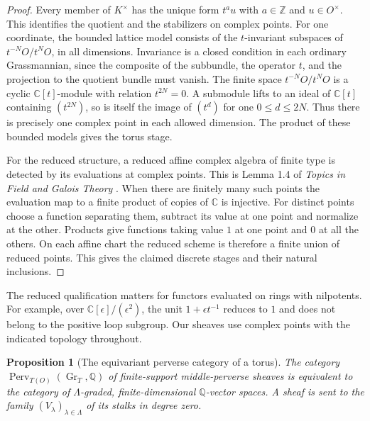\documentclass[11pt,oneside,openany]{book}
\newtheorem{proposition}[theorem]{Proposition}
\theoremstyle{definition}
\theoremstyle{remark}
\begin{document}
\begin{proof}
Every member of \(K^\times\) has the unique form \(t^a u\)
with \(a\in\mathbb Z\) and \(u\in O^\times\).
This identifies the quotient and the stabilizers on complex points.
For one coordinate, the bounded lattice model consists of the
\(t\)-invariant subspaces of \(t^{-N}O/t^NO\), in all dimensions.
Invariance is a closed condition in each ordinary Grassmannian,
since the composite of the subbundle, the operator \(t\), and the
projection to the quotient bundle must vanish.
The finite space \(t^{-N}O/t^NO\) is a cyclic \(\mathbb C[t]\)-module
with relation \(t^{2N}=0\). A submodule lifts to an ideal of
\(\mathbb C[t]\) containing \((t^{2N})\), so is itself the image
of \((t^d)\) for one \(0\leq d\leq 2N\).
Thus there is precisely one complex point in each allowed dimension.
The product of these bounded models gives the torus stage.

For the reduced structure, a reduced affine complex algebra of
finite type is detected by its evaluations at complex points.
This is Lemma 1.4 of \emph{Topics in Field and Galois Theory}
\cite[\texttt{PV04}, PDF p.~5]{mg-fieldtopics}.
When there are finitely many such points the evaluation map to a
finite product of copies of \(\mathbb C\) is injective. For distinct
points choose a function separating them, subtract its
value at one point and normalize at the other. Products give
functions taking value \(1\) at one point and \(0\) at all the
others. On each affine chart the reduced scheme is therefore a
finite union of reduced points. This gives the claimed discrete
stages and their natural inclusions.
\end{proof}

The reduced qualification matters for functors evaluated on rings
with nilpotents. For example, over
\(\mathbb C[\epsilon]/(\epsilon^2)\), the unit
\(1+\epsilon t^{-1}\) reduces to \(1\) and does not belong
to the positive loop subgroup. Our sheaves use complex points
with the indicated topology throughout.

\begin{proposition}[The equivariant perverse category of a torus]
\label{res:GS02}
The category
\(\operatorname{Perv}_{T(O)}(\operatorname{Gr}_T,\mathbb Q)\)
of finite-support middle-perverse sheaves is equivalent to
the category of \(\Lambda\)-graded, finite-dimensional
\(\mathbb Q\)-vector spaces. A sheaf is sent to the family
\((V_\lambda)_{\lambda\in\Lambda}\) of its stalks in degree zero.
\end{proposition}
\end{document}
